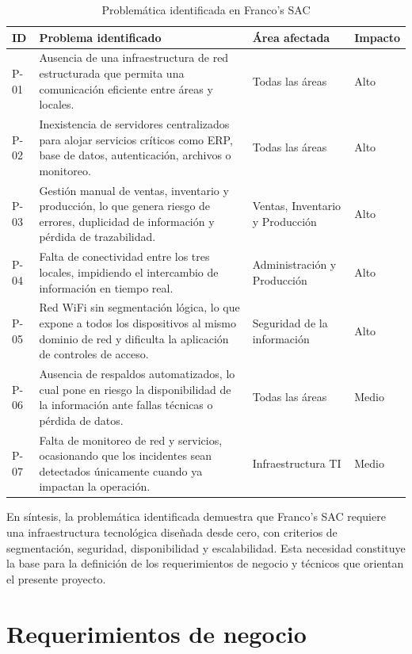 \documentclass[11pt, a4paper, oneside]{report}
\begin{document}
\begin{table}[htbp]
\centering
\caption{Problemática identificada en Franco's SAC}
\small
\renewcommand{\arraystretch}{1.25}
\begin{tabularx}{\textwidth}{|N{1.5cm}|X|M{3.2cm}|N{2cm}|}
\hline
{}
\textbf{ID} & \textbf{Problema identificado} & \textbf{Área afectada} & \textbf{Impacto} \\
\hline
P-01 & Ausencia de una infraestructura de red estructurada que permita una comunicación eficiente entre áreas y locales. & Todas las áreas & Alto \\
\hline
P-02 & Inexistencia de servidores centralizados para alojar servicios críticos como ERP, base de datos, autenticación, archivos o monitoreo. & Todas las áreas & Alto \\
\hline
P-03 & Gestión manual de ventas, inventario y producción, lo que genera riesgo de errores, duplicidad de información y pérdida de trazabilidad. & Ventas, Inventario y Producción & Alto \\
\hline
P-04 & Falta de conectividad entre los tres locales, impidiendo el intercambio de información en tiempo real. & Administración y Producción & Alto \\
\hline
P-05 & Red WiFi sin segmentación lógica, lo que expone a todos los dispositivos al mismo dominio de red y dificulta la aplicación de controles de acceso. & Seguridad de la información & Alto \\
\hline
P-06 & Ausencia de respaldos automatizados, lo cual pone en riesgo la disponibilidad de la información ante fallas técnicas o pérdida de datos. & Todas las áreas & Medio \\
\hline
P-07 & Falta de monitoreo de red y servicios, ocasionando que los incidentes sean detectados únicamente cuando ya impactan la operación. & Infraestructura TI & Medio \\
\hline
\end{tabularx}
\end{table}

En síntesis, la problemática identificada demuestra que Franco's SAC requiere una infraestructura tecnológica diseñada desde cero, con criterios de segmentación, seguridad, disponibilidad y escalabilidad. Esta necesidad constituye la base para la definición de los requerimientos de negocio y técnicos que orientan el presente proyecto.

\section{Requerimientos de negocio}
\end{document}
